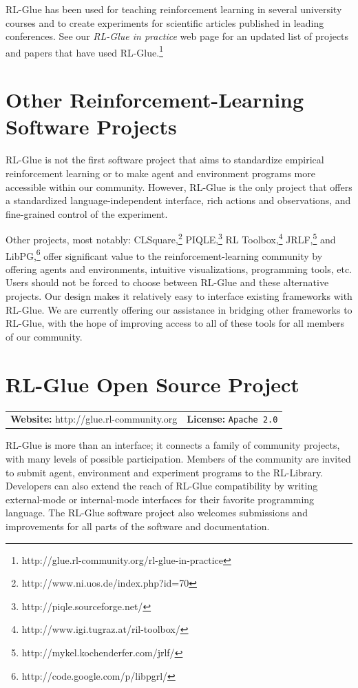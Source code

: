 \documentclass[twoside,11pt]{article}
\begin{document}
RL-Glue has been used for teaching reinforcement learning in several university courses and to create experiments for scientific articles published in leading conferences.  See our \textit{RL-Glue in practice} web page for an updated list of projects and papers that have used RL-Glue.\footnote{http://glue.rl-community.org/rl-glue-in-practice} 



\section{Other Reinforcement-Learning Software Projects}
RL-Glue is not the first software project that aims to  standardize empirical reinforcement learning or to make agent and environment programs more accessible within our community.  However, RL-Glue is the only project that offers a standardized language-independent interface, rich actions and observations, and fine-grained control of the experiment.

Other projects, most notably: CLSquare,\footnote{http://www.ni.uos.de/index.php?id=70}  PIQLE,\footnote{http://piqle.sourceforge.net/} RL Toolbox,\footnote{http://www.igi.tugraz.at/ril-toolbox/} JRLF,\footnote{http://mykel.kochenderfer.com/jrlf/}  and LibPG,\footnote{http://code.google.com/p/libpgrl/} offer significant value to the reinforcement-learning community by offering agents and environments, intuitive visualizations, programming tools, etc.  Users should not be forced to choose between RL-Glue and these alternative projects. Our design makes it relatively easy to interface existing frameworks with RL-Glue.  We are currently offering our assistance in bridging other frameworks to RL-Glue, with the hope of improving access to all of these tools for all members of our community.

 
\section{RL-Glue Open Source Project}
\begin{tabular}{ l l}
  \textbf{Website:} http://glue.rl-community.org  & \textbf{License:} \texttt{Apache 2.0}  \end{tabular}
\newline
\newline
RL-Glue is more than an interface; it connects a family of community projects, with many levels of possible participation. Members of the community are invited to submit agent, environment and experiment programs to the RL-Library. Developers can also extend the reach of RL-Glue compatibility by writing external-mode or internal-mode interfaces for their favorite programming language.  The RL-Glue software project also welcomes submissions and improvements for all parts of the software and documentation.  
\end{document}
